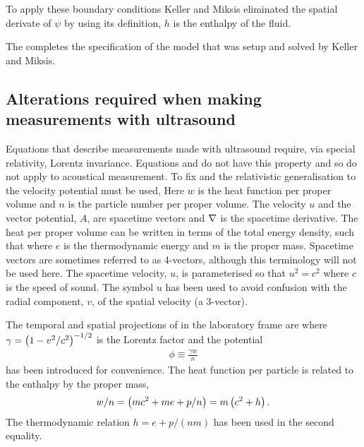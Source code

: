 To apply these boundary conditions Keller and Miksis eliminated the spatial derivate of $\psi$ by using its definition,
$h$ is the enthalpy of the fluid.

The completes the specification of the model that was setup and solved by Keller and Miksis\cite{Keller1980}.

\subsection{Alterations required when making measurements with ultrasound}
\label{sec:measurement:alterations}
Equations that describe  measurements made with ultrasound require, via  special relativity,  Lorentz invariance.
Equations  and  do not have this property and so 
do not apply to acoustical measurement.
To fix   and  the  relativistic generalisation to the velocity potential\cite{LandauBook} must be used,
Here $w$ is the heat function per proper volume and $n$ is the particle number per proper volume.
The velocity $u$ and the vector potential, $A$,  are spacetime vectors and $\nabla$ is the spacetime derivative.
The heat per proper volume can be written in terms of the total energy density, 
such that\cite{LandauBook, Doran2003}
where $e$ is the thermodynamic energy and $m$ is the proper mass.
Spacetime vectors are sometimes referred to as 4-vectors, although this terminology will not be used here.
The spacetime velocity, $u$, is parameterised so that $u^2 = c^2$ where $c$ is the speed of sound.
The symbol $u$ has been used to avoid confusion with the radial component, $v$, of the spatial velocity (a 3-vector).


%
The temporal and spatial projections of  in the laboratory frame are
where  $\gamma = \left( 1-v^2/c^2 \right)^{-1/2}$ is the Lorentz factor and  the potential 
\begin{align}
  \phi \equiv \frac{\gamma w}{n} \label{eqn:phiDefn}
\end{align}
has been introduced for convenience.
The heat function per particle is related to the enthalpy by the proper mass,
\begin{align}
  w/n = \left( mc^2 + me + p/n \right) = m\left( c^2 +  h \right).
\end{align}
The thermodynamic relation $h = e + p/(nm)$ has been used in the second equality.

